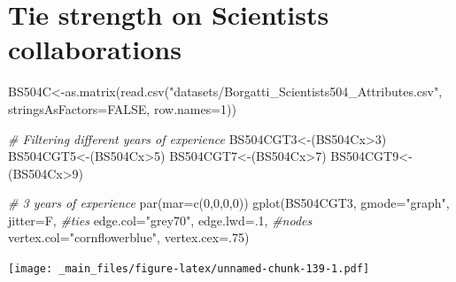 \documentclass[
  notitlepage,
  onecolumn,
  openany]{book}
\newenvironment{Shaded}{\begin{snugshade}}{\end{snugshade}}
\newcommand{\AttributeTok}[1]{\textcolor[rgb]{0.77,0.63,0.00}{#1}}
\newcommand{\CommentTok}[1]{\textcolor[rgb]{0.56,0.35,0.01}{\textit{#1}}}
\newcommand{\ConstantTok}[1]{\textcolor[rgb]{0.00,0.00,0.00}{#1}}
\newcommand{\DecValTok}[1]{\textcolor[rgb]{0.00,0.00,0.81}{#1}}
\newcommand{\FunctionTok}[1]{\textcolor[rgb]{0.00,0.00,0.00}{#1}}
\newcommand{\NormalTok}[1]{#1}
\newcommand{\OtherTok}[1]{\textcolor[rgb]{0.56,0.35,0.01}{#1}}
\newcommand{\SpecialCharTok}[1]{\textcolor[rgb]{0.00,0.00,0.00}{#1}}
\newcommand{\StringTok}[1]{\textcolor[rgb]{0.31,0.60,0.02}{#1}}
\begin{document}
\hypertarget{tie-strength-on-scientists-collaborations}{%
\section{Tie strength on Scientists collaborations}\label{tie-strength-on-scientists-collaborations}}

\begin{Shaded}
\begin{Highlighting}[]
\NormalTok{BS504C}\OtherTok{\textless{}{-}}\FunctionTok{as.matrix}\NormalTok{(}\FunctionTok{read.csv}\NormalTok{(}\StringTok{"datasets/Borgatti\_Scientists504\_Attributes.csv"}\NormalTok{,}
                           \AttributeTok{stringsAsFactors=}\ConstantTok{FALSE}\NormalTok{, }\AttributeTok{row.names=}\DecValTok{1}\NormalTok{))}

\CommentTok{\# Filtering different years of experience}
\NormalTok{BS504CGT3}\OtherTok{\textless{}{-}}\NormalTok{(BS504Cx}\SpecialCharTok{\textgreater{}}\DecValTok{3}\NormalTok{)}
\NormalTok{BS504CGT5}\OtherTok{\textless{}{-}}\NormalTok{(BS504Cx}\SpecialCharTok{\textgreater{}}\DecValTok{5}\NormalTok{)}
\NormalTok{BS504CGT7}\OtherTok{\textless{}{-}}\NormalTok{(BS504Cx}\SpecialCharTok{\textgreater{}}\DecValTok{7}\NormalTok{)}
\NormalTok{BS504CGT9}\OtherTok{\textless{}{-}}\NormalTok{(BS504Cx}\SpecialCharTok{\textgreater{}}\DecValTok{9}\NormalTok{)}
\end{Highlighting}
\end{Shaded}

\begin{Shaded}
\begin{Highlighting}[]
\CommentTok{\# 3 years of experience}
\FunctionTok{par}\NormalTok{(}\AttributeTok{mar=}\FunctionTok{c}\NormalTok{(}\DecValTok{0}\NormalTok{,}\DecValTok{0}\NormalTok{,}\DecValTok{0}\NormalTok{,}\DecValTok{0}\NormalTok{))}
\FunctionTok{gplot}\NormalTok{(BS504CGT3,}
      \AttributeTok{gmode=}\StringTok{"graph"}\NormalTok{,}
      \AttributeTok{jitter=}\NormalTok{F,}
      \CommentTok{\#ties}
      \AttributeTok{edge.col=}\StringTok{"grey70"}\NormalTok{, }
      \AttributeTok{edge.lwd=}\NormalTok{.}\DecValTok{1}\NormalTok{,}
      \CommentTok{\#nodes}
      \AttributeTok{vertex.col=}\StringTok{"cornflowerblue"}\NormalTok{,}
      \AttributeTok{vertex.cex=}\NormalTok{.}\DecValTok{75}\NormalTok{)}
\end{Highlighting}
\end{Shaded}

\texttt{[image: \_main\_files/figure-latex/unnamed-chunk-139-1.pdf]}
\end{document}
